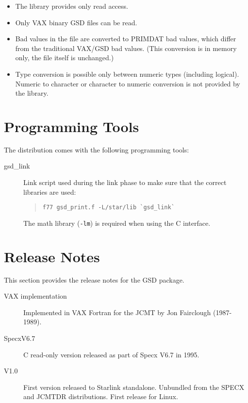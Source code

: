 \documentclass[oneside,11pt]{starlink}
\begin{document}
\begin{itemize}
\item The library provides only read access.

\item Only VAX binary GSD files can be read.

\item Bad values in the file are converted to PRIMDAT bad
values\cite{primdat}, which differ from the traditional VAX/GSD bad
values. (This conversion is in memory only, the file itself is unchanged.)

\item Type conversion is possible only between numeric types (including
logical). Numeric to character or character to numeric conversion is not
provided by the library.

\end{itemize}

\section{Programming Tools}

The distribution comes with the following programming tools:

\begin{description}
\item[gsd\_link] \mbox{}

Link script used during the link phase to make sure that the correct
libraries are used:
\begin{quote}
\begin{verbatim}
f77 gsd_print.f -L/star/lib `gsd_link`
\end{verbatim}
\end{quote}

The math library (\texttt{-lm}) is required when using the C interface.

\end{description}

\section{Release Notes}

This section provides the release notes for the GSD package.

\begin{description}
\item[VAX implementation] \mbox{}

Implemented in VAX Fortran for the JCMT by Jon Fairclough (1987-1989).

\item[SpecxV6.7] \mbox{}

C read-only version released as part of Specx V6.7 in 1995.

\item[V1.0] \mbox{}

First version released to Starlink standalone. Unbundled from the
SPECX and JCMTDR distributions. First release for Linux.

\end{description}
\end{document}
